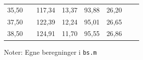 \documentclass{article}
\begin{document}
\begin{appendices}
\begin{table}[h]
{\begin{tabular}{cXcccccr}
         35{,}50  &&      117{,}34  &       13{,}37   &      93{,}88   &      26{,}20\\
         37{,}50  &&      122{,}39  &       12{,}24   &      95{,}01  &       26{,}65\\
         38{,}50  &&      124{,}91  &       11{,}70   &      95{,}55  &       26{,}86\\
	\bottomrule[1pt]
	\end{tabular}}
	\begin{minipage}{\linewidth}
		\footnotesize{Noter: Egne beregninger i \texttt{bs.m} }
	\end{minipage}
\end{table}	

\clearpage 


 

\end{appendices}
\end{document}
